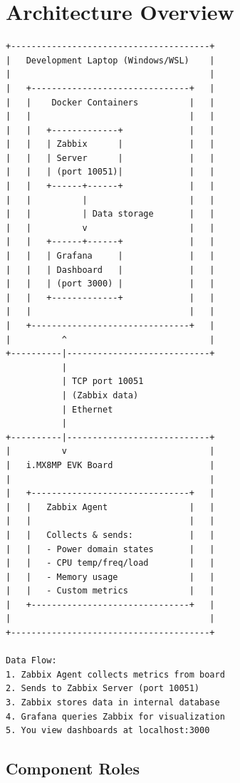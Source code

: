 \documentclass[12pt,a4paper]{report}
\begin{document}
\section{Architecture Overview}
\begin{verbatim}
+---------------------------------------+
|   Development Laptop (Windows/WSL)    |
|                                       |
|   +-------------------------------+   |
|   |    Docker Containers          |   |
|   |                               |   |
|   |   +-------------+             |   |
|   |   | Zabbix      |             |   |
|   |   | Server      |             |   |
|   |   | (port 10051)|             |   |
|   |   +------+------+             |   |
|   |          |                    |   |
|   |          | Data storage       |   |
|   |          v                    |   |
|   |   +------+------+             |   |
|   |   | Grafana     |             |   |
|   |   | Dashboard   |             |   |
|   |   | (port 3000) |             |   |
|   |   +-------------+             |   |
|   |                               |   |
|   +-------------------------------+   |
|          ^                            |
+----------|----------------------------+
           |
           | TCP port 10051
           | (Zabbix data)
           | Ethernet
           |
+----------|----------------------------+
|          v                            |
|   i.MX8MP EVK Board                   |
|                                       |
|   +-------------------------------+   |
|   |   Zabbix Agent                |   |
|   |                               |   |
|   |   Collects & sends:           |   |
|   |   - Power domain states       |   |
|   |   - CPU temp/freq/load        |   |
|   |   - Memory usage              |   |
|   |   - Custom metrics            |   |
|   +-------------------------------+   |
|                                       |
+---------------------------------------+

Data Flow:
1. Zabbix Agent collects metrics from board
2. Sends to Zabbix Server (port 10051)
3. Zabbix stores data in internal database
4. Grafana queries Zabbix for visualization
5. You view dashboards at localhost:3000
\end{verbatim}


\subsection{Component Roles}
\end{document}
